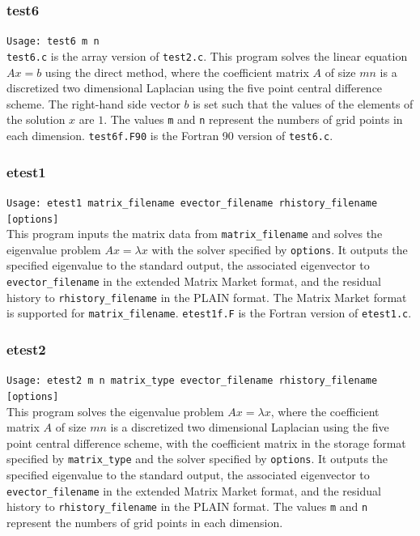 \documentclass[a4paper]{article}
\begin{document}
\subsubsection{test6}

\verb+Usage: test6 m n+\\

{\tt test6.c} is the array version of {\tt test2.c}.
This program solves the linear equation $Ax = b$ using the direct method,
where the coefficient 
matrix $A$ of size $mn$ is a discretized two dimensional 
Laplacian using the five
point central difference scheme. 
The right-hand side vector $b$ is set such that the values of the elements
of the solution $x$ are $1$. 
The values {\tt m} and  {\tt n} represent the numbers of grid points
in each dimension. 
{\tt test6f.F90} is the Fortran 90 version of {\tt test6.c}.

\subsubsection{etest1}

\verb+Usage: etest1 matrix_filename evector_filename rhistory_filename [options]+\\

This program inputs the matrix data from {\tt matrix\_filename} and
solves the eigenvalue problem $Ax=\lambda x$ with 
the solver specified by {\tt options}. 
It outputs the specified eigenvalue to the standard output, 
the associated eigenvector to {\tt evector\_filename} 
in the extended Matrix Market format, and 
the residual history to {\tt rhistory\_filename} 
in the PLAIN format.
The Matrix Market format is supported for {\tt matrix\_filename}. 
{\tt etest1f.F} is the Fortran version of {\tt etest1.c}.

\subsubsection{etest2}

\verb+Usage: etest2 m n matrix_type evector_filename rhistory_filename [options]+\\

This program solves the eigenvalue problem $Ax = \lambda x$, where the 
coefficient matrix $A$ of size $mn$ is a discretized two dimensional Laplacian using the five
point central difference scheme, with the coefficient matrix in the storage format specified
by \verb|matrix_type| and the solver specified by {\tt options}. 
It outputs the specified eigenvalue to the standard output, 
the associated eigenvector to {\tt evector\_filename} in the
extended Matrix Market format, and 
the residual history to {\tt rhistory\_filename} 
in the PLAIN format. 
The values {\tt m} and {\tt n} represent the numbers of grid points
in each dimension. 
\end{document}
